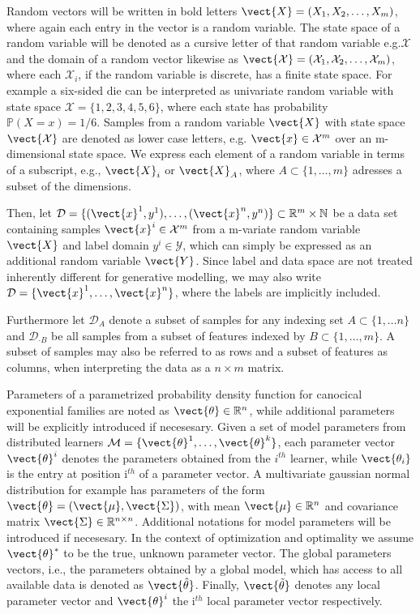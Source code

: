     Random vectors will be written in bold letters $\vect{X} = (X_1, X_2, \ldots, X_m)$, where again each entry in the vector is a random variable.
    The state space of a random variable will be denoted as a cursive letter of that random variable e.g.$\mathcal{X}$ and the domain of a random vector likewise as $\vect{\mathcal{X}} = (\mathcal{X}_1, \mathcal{X}_2, \ldots, \mathcal{X}_m)$, where each $\mathcal{X}_i$, if the random variable is discrete, has a finite state space.
    For example a six-sided die can be interpreted as univariate random variable with state space $\mathcal{X} = \{1,2,3,4,5,6\}$, where each state has probability $\mathbb{P}(X=x) = 1/6$.
    Samples from a random variable $\vect{X}$  with state space $\vect{\mathcal{X}}$ are denoted as lower case letters, e.g. $\vect{x} \in \mathcal{X}^m$ over an m-dimensional state space.
    We express each element of a random variable in terms of a subscript, e.g., $\vect{X}_i$ or $\vect{X}_A$, where $A \subset\{1, \ldots, m\} $ adresses a subset of the dimensions.

    Then, let $\mathcal{D} = \{(\vect{x}^1, y^1), \ldots, (\vect{x}^n, y^n)\} \subset \mathbb{R}^m \times \mathbb{N}$ be a data set containing samples $\vect{x}^i \in \mathcal{X}^m$ from a m-variate random variable $\vect{X}$ and label domain $y^i \in \mathcal{Y}$, which can simply be expressed as an additional random variable $\vect{Y}$.
    Since label and data space are not treated inherently different for generative modelling, we may also write $\mathcal{D} = \{\vect{x}^1, \ldots, \vect{x}^n\}$, where the labels are implicitly included.

    Furthermore let $\mathcal{D}_A$ denote a subset of samples for any indexing set $A\subset \{1, \ldots n\}$ and $\mathcal{D}_{\cdot B}$ be all samples from a subset of features indexed by $B \subset \{1, \ldots, m\}$.
    A subset of samples may also be referred to as rows and a subset of features as columns, when interpreting the data as a $n \times m$ matrix.  

    Parameters of a parametrized probability density function for canocical exponential families are noted as $\vect{\theta} \in \mathbb{R}^n$, while additional parameters will be explicitly introduced if necesesary.
    Given a set of model parameters from distributed learners $\mathcal{M} = \{\vect{\theta}^1,  \ldots, \vect{\theta}^k\}$, each parameter vector $\vect{\theta}^i$ denotes the parameters obtained from the  $i^{th}$ learner, while $\vect{\theta_i}$ is the entry at position i$^{th}$ of a parameter vector.
    A multivariate gaussian normal distribution for example has parameters of the form $\vect{\theta} = (\vect{\mu}, \vect{\Sigma})$, with mean $\vect{\mu} \in \mathbb{R}^{n}$ and covariance matrix $\vect{\Sigma} \in \mathbb{R}^{n \times n}$.
    Additional notations for model parameters will be introduced if necesesary.
    In the context of optimization and optimality we assume $\vect{\theta}^*$ to be the true, unknown parameter vector.
    The global parameters vectors, i.e., the parameters obtained by a global model, which has access to all available data is denoted as  $\vect{\hat{\theta}}$.
    Finally, $\vect{\tilde{\theta}}$ denotes any local parameter vector and $\vect{\theta}^{i}$ the i$^{th}$ local parameter vector respectively.

